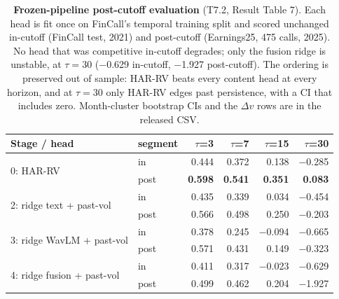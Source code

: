 \begin{table}[t]
\centering
\small
\begin{tabular}{llrrrr}
\toprule
Stage / head & segment & $\tau$=3 & $\tau$=7 & $\tau$=15 & $\tau$=30 \\
\midrule
\multirow{2}{*}{0: HAR-RV} & in & 0.444 & 0.372 & 0.138 & $-$0.285 \\
 & post & \textbf{0.598} & \textbf{0.541} & \textbf{0.351} & \textbf{0.083} \\
\multirow{2}{*}{2: ridge text + past-vol} & in & 0.435 & 0.339 & 0.034 & $-$0.454 \\
 & post & 0.566 & 0.498 & 0.250 & $-$0.203 \\
\multirow{2}{*}{3: ridge WavLM + past-vol} & in & 0.378 & 0.245 & $-$0.094 & $-$0.665 \\
 & post & 0.571 & 0.431 & 0.149 & $-$0.323 \\
\multirow{2}{*}{4: ridge fusion + past-vol} & in & 0.411 & 0.317 & $-$0.023 & $-$0.629 \\
 & post & 0.499 & 0.462 & 0.204 & $-$1.927 \\
\bottomrule
\end{tabular}
\caption{\textbf{Frozen-pipeline post-cutoff evaluation} (T7.2, Result Table 7). Each
head is fit once on FinCall's temporal training split and scored unchanged in-cutoff
(FinCall test, 2021) and post-cutoff (Earnings25, 475 calls, 2025). No head
that was competitive in-cutoff degrades; only the fusion ridge is unstable, at
$\tau{=}30$ ($-$0.629 in-cutoff, $-$1.927 post-cutoff). The ordering is preserved out of sample: HAR-RV beats every content
head at every horizon, and at $\tau{=}30$ only HAR-RV edges past persistence, with
a CI that includes zero. Month-cluster bootstrap CIs and the $\Delta v$ rows are in
the released CSV.}
\label{tab:lookahead}
\end{table}
